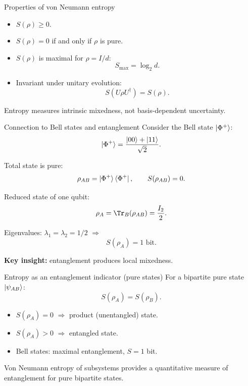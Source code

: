 \documentclass[aspectratio=169]{beamer}
\begin{document}
\begin{frame}{Properties of von Neumann entropy}
\begin{itemize}
\item $S(\rho)\ge 0$.
\item $S(\rho)=0$ if and only if $\rho$ is pure.
\item $S(\rho)$ is maximal for $\rho=I/d$:
\[
S_{\max} = \log_2 d.
\]
\item Invariant under unitary evolution:
\[
S(U\rho U^\dagger) = S(\rho).
\]
\end{itemize}

\medskip
Entropy measures intrinsic mixedness, not basis-dependent uncertainty.
\end{frame}

\begin{frame}{Connection to Bell states and entanglement}
Consider the Bell state $\ket{\Phi^+}$:
\[
\ket{\Phi^+}=\frac{\ket{00}+\ket{11}}{\sqrt{2}}.
\]

\medskip
Total state is pure:
\[
\rho_{AB}=\ket{\Phi^+}\bra{\Phi^+}, \qquad S(\rho_{AB})=0.
\]

\medskip
Reduced state of one qubit:
\[
\rho_A = \Tr_B(\rho_{AB})=\frac{I_2}{2}.
\]

\medskip
Eigenvalues: $\lambda_1=\lambda_2=1/2$ $\Rightarrow$
\[
S(\rho_A)=1 \text{ bit}.
\]

\medskip
\textbf{Key insight:} entanglement produces local mixedness.
\end{frame}

\begin{frame}{Entropy as an entanglement indicator (pure states)}
For a bipartite pure state $\ket{\psi_{AB}}$:
\[
S(\rho_A)=S(\rho_B).
\]

\medskip
\begin{itemize}
\item $S(\rho_A)=0$ $\Rightarrow$ product (unentangled) state.
\item $S(\rho_A)>0$ $\Rightarrow$ entangled state.
\item Bell states: maximal entanglement, $S=1$ bit.
\end{itemize}

\medskip
Von Neumann entropy of subsystems provides a quantitative measure of
entanglement for pure bipartite states.
\end{frame}
\end{document}
